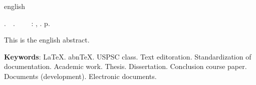 \begin{resumo}[Abstract]
 \begin{otherlanguage*}{english}
   \begin{flushleft} 
   	\setlength{\absparsep}{0pt} %
   	\SingleSpacing 
   	\imprimirautorabr.~~\textbf{\imprimirtitleabstract}.~~\imprimirorientador~~	
   	\imprimirlocal: \imprimirinstituicao, \imprimirdata. \pageref{LastPage}p. 
   \end{flushleft}
	\OnehalfSpacing 
   This is the english abstract.

   \vspace{\onelineskip}
 
   \noindent 
   \textbf{Keywords}: LaTeX. abnTeX. USPSC class. Text editoration. Standardization of documentation. Academic work. Thesis. Dissertation. Conclusion course paper. Documents (development). Electronic documents.
   \end{otherlanguage*}
\end{resumo}
